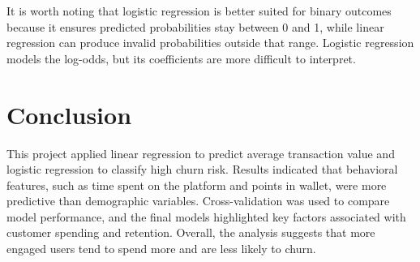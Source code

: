 \documentclass[
  letterpaper,
  DIV=11,
  numbers=noendperiod]{scrartcl}
\begin{document}
It is worth noting that logistic regression is better suited for binary
outcomes because it ensures predicted probabilities stay between 0 and
1, while linear regression can produce invalid probabilities outside
that range. Logistic regression models the log-odds, but its
coefficients are more difficult to interpret.

\section{Conclusion}\label{conclusion}

This project applied linear regression to predict average transaction
value and logistic regression to classify high churn risk. Results
indicated that behavioral features, such as time spent on the platform
and points in wallet, were more predictive than demographic variables.
Cross-validation was used to compare model performance, and the final
models highlighted key factors associated with customer spending and
retention. Overall, the analysis suggests that more engaged users tend
to spend more and are less likely to churn.
\end{document}
